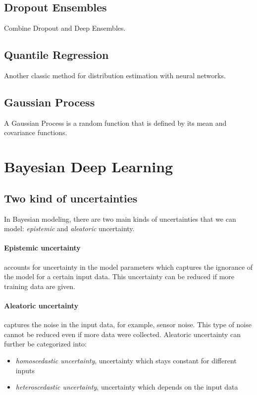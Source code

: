 \subsection{Dropout Ensembles}
Combine Dropout and Deep Ensembles.

\subsection{Quantile Regression}
Another classic method for distribution estimation with neural networks.

\subsection{Gaussian Process}
A Gaussian Process is a random function that is defined by its mean and covariance functions.

\section{Bayesian Deep Learning}

\subsection{Two kind of uncertainties}
In Bayesian modeling, there are two main kinds of uncertainties that we can model: \textit{epistemic} and \textit{aleatoric} uncertainty.

\paragraph{Epistemic uncertainty} accounts for uncertainty in the model parameters which captures the ignorance of the model for a certain input data. This uncertainty can be reduced if more training data are given.

\paragraph{Aleatoric uncertainty} captures the noise in the input data, for example, sensor noise. This type of noise cannot be reduced even if more data were collected.
Aleatoric uncertainty can further be categorized into:
\begin{itemize}
    \item \textit{homoscedastic uncertainty}, uncertainty which stays constant for different inputs
    \item \textit{heteroscedastic uncertainty}, uncertainty which depends on the input data
\end{itemize}

